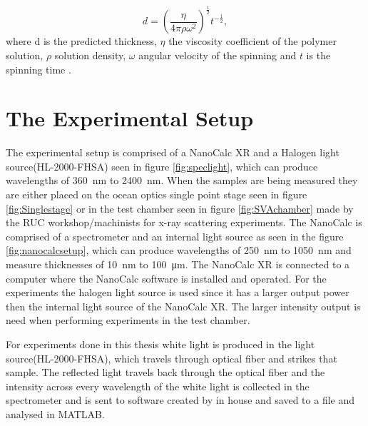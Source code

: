 \documentclass[MasterThesisMain.tex]{subfiles}
\begin{document}
\begin{equation}
d = \left(\frac{\eta}{4\pi\rho\omega^2}\right)^{\frac{1}{2}} t^{-\frac{1}{2}},
\end{equation}  
where d is the predicted thickness, $\eta$ the viscosity coefficient of the polymer solution, $\rho$ solution density, $\omega$ angular velocity of the spinning and $t$ is the spinning time \cite{petty2008molecular}.

\section{The Experimental Setup}
The experimental setup is comprised of a NanoCalc XR and a Halogen light source(HL-2000-FHSA) seen in figure \ref{fig:speclight}, which can produce wavelengths of \SI{360}{\nano\meter} to \SI{2400}{\nano\meter}. When the samples are being measured they are either placed on the ocean optics single point stage seen in figure \ref{fig:Singlestage} or in the test chamber seen in figure \ref{fig:SVAchamber} made by the RUC workshop/machinists for x-ray scattering experiments. The NanoCalc is comprised of a spectrometer and an internal light source as seen in the figure \ref{fig:nanocalcsetup}, which can produce wavelengths of \SI{250}{\nano\meter} to \SI{1050}{\nano\meter} and measure thicknesses of \SI{10}{\nano\meter} to \SI{100}{\micro\meter}. The NanoCalc XR is connected to a computer where the NanoCalc software is installed and operated. For the experiments the halogen light source is used since it has a larger output power then the internal light source of the NanoCalc XR. The larger intensity output is need when performing experiments in the test chamber. 

For experiments done in this thesis white light is produced in the light source(HL-2000-FHSA), which travels through optical fiber and strikes that sample. The reflected light travels back through the optical fiber and the intensity across every wavelength of the white light is collected in the spectrometer and is sent to software created by in house and saved to a file and analysed in MATLAB\textsuperscript{\textregistered}.  
	
\end{document}
